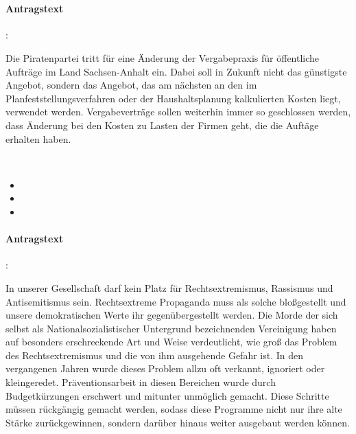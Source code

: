
\\

\paragraph{Antragstext}:

Die Piratenpartei tritt für eine Änderung der Vergabepraxis für öffentliche Aufträge im Land Sachsen-Anhalt ein. Dabei soll in Zukunft nicht das günstigste Angebot, sondern das Angebot, das am nächsten an den im Planfeststellungsverfahren oder der Haushaltsplanung kalkulierten Kosten liegt, verwendet werden. Vergabeverträge sollen weiterhin immer so geschlossen werden, dass Änderung bei den Kosten zu Lasten der Firmen geht, die die Auftäge erhalten haben.



\label{sa:rechtsex1}
\\
\begin{itemize}
\item {}
\item {}
\item {}
\end{itemize}

\paragraph{Antragstext}:

In unserer Gesellschaft darf kein Platz für Rechtsextremismus, Rassismus und Antisemitismus sein. Rechtsextreme Propaganda muss als solche bloßgestellt und unsere demokratischen Werte ihr gegenübergestellt werden. Die Morde der sich selbst als {\Gu}Nationalsozialistischer Untergrund{\Go} bezeichnenden Vereinigung haben auf besonders erschreckende Art und Weise verdeutlicht, wie groß das Problem des Rechtsextremismus und die von ihm ausgehende Gefahr ist. In den vergangenen Jahren wurde dieses Problem allzu oft verkannt, ignoriert oder kleingeredet. Präventionsarbeit in diesen Bereichen wurde durch Budgetkürzungen erschwert und mitunter unmöglich gemacht. Diese Schritte müssen rückgängig gemacht werden, sodass diese Programme nicht nur ihre alte Stärke zurückgewinnen, sondern darüber hinaus weiter ausgebaut werden können.

